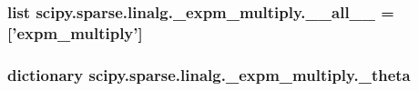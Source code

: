 \subsubsection[{\+\_\+\+\_\+all\+\_\+\+\_\+}]{\setlength{\rightskip}{0pt plus 5cm}list scipy.\+sparse.\+linalg.\+\_\+expm\+\_\+multiply.\+\_\+\+\_\+all\+\_\+\+\_\+ = \mbox{[}'{\bf expm\+\_\+multiply}'\mbox{]}}\label{namespacescipy_1_1sparse_1_1linalg_1_1__expm__multiply_a8e3a3e9b4bc49291b5005df471e1ca61}
\hypertarget{namespacescipy_1_1sparse_1_1linalg_1_1__expm__multiply_a725e8a909fe0ab2f58f6a5a71bdc6f0e}{}
\subsubsection[{\+\_\+theta}]{\setlength{\rightskip}{0pt plus 5cm}dictionary scipy.\+sparse.\+linalg.\+\_\+expm\+\_\+multiply.\+\_\+theta}\label{namespacescipy_1_1sparse_1_1linalg_1_1__expm__multiply_a725e8a909fe0ab2f58f6a5a71bdc6f0e}

